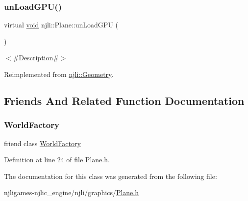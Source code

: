 \subsubsection{\texorpdfstring{un\+Load\+G\+P\+U()}{unLoadGPU()}}
{\footnotesize\ttfamily virtual \mbox{\hyperlink{_thread_8h_af1e856da2e658414cb2456cb6f7ebc66}{void}} njli\+::\+Plane\+::un\+Load\+G\+PU (\begin{DoxyParamCaption}{ }\end{DoxyParamCaption})\hspace{0.3cm}{\ttfamily [virtual]}}

$<$\#\+Description\#$>$ 

Reimplemented from \mbox{\hyperlink{classnjli_1_1_geometry_a1c7f801932e981d35c18acd5bf11c8c4}{njli\+::\+Geometry}}.



\subsection{Friends And Related Function Documentation}
\mbox{\label{classnjli_1_1_plane_acb96ebb09abe8f2a37a915a842babfac}} 
\subsubsection{\texorpdfstring{World\+Factory}{WorldFactory}}
{\footnotesize\ttfamily friend class \mbox{\hyperlink{classnjli_1_1_world_factory}{World\+Factory}}\hspace{0.3cm}{\ttfamily [friend]}}



Definition at line 24 of file Plane.\+h.



The documentation for this class was generated from the following file\+:\begin{DoxyCompactItemize}
\item 
njligames-\/njlic\+\_\+engine/njli/graphics/\mbox{\hyperlink{_plane_8h}{Plane.\+h}}\end{DoxyCompactItemize}
